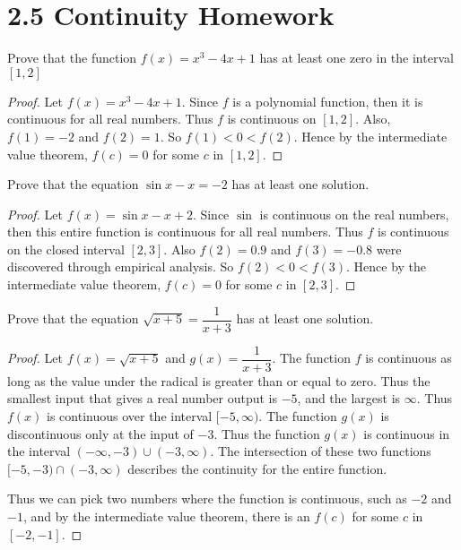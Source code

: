 \documentclass[12pt]{article}
\begin{document}
\section*{2.5 Continuity Homework}

Prove that the function $f(x) = x^3 - 4x +1$ has at least one zero in
the interval $[1,2]$

\begin{proof}
Let $f(x) = x^3 - 4x +1$. Since $f$ is a polynomial function, then it is
continuous for all real numbers. Thus $f$ is continuous on $[1,2]$.
Also, $f(1) = -2$ and $f(2) = 1$. So $f(1) < 0 < f(2)$. Hence by the intermediate value
theorem, $f(c) = 0$ for some $c$ in $[1,2]$.
\end{proof}

Prove that the equation $\sin x - x = -2$ has at least one solution.

\begin{proof}
  Let $f(x) = \sin x - x + 2$. Since $\sin$ is continuous on the real numbers, then this entire function is
  continuous for all real numbers. Thus $f$ is continuous on the closed interval $[2,3]$.  Also $f(2) = 0.9$
  and $f(3) = -0.8$ were discovered through empirical analysis. So $f(2) < 0 < f(3)$. Hence by the
  intermediate value theorem, $f(c) = 0$ for some $c$ in $[2,3]$.
\end{proof}

Prove that the equation $\sqrt{x+5}=\dfrac{1}{x+3}$ has at least one solution.

\begin{proof}
Let $f(x) = \sqrt{x+5}$ and $g(x) = \dfrac{1}{x+3}$. The function $f$ is continuous as long as the value under
the radical is greater than or equal to zero. Thus the smallest input that gives a real number output is $-5$,
and the largest is $\infty$. Thus $f(x)$ is continuous over the interval $[-5,\infty)$.
The function $g(x)$ is discontinuous only at the input of $-3$. Thus the function $g(x)$ is continuous in the
interval $(-\infty,-3)\cup(-3,\infty)$. The intersection of these two functions $[-5,-3)\cap(-3,\infty)$
describes the continuity for the entire function.

Thus we can pick two numbers where the function is continuous, such as $-2$ and $-1$, and by the intermediate
value theorem, there is an $f(c)$ for some $c$ in $[-2,-1]$.
\end{proof}
\end{document}
